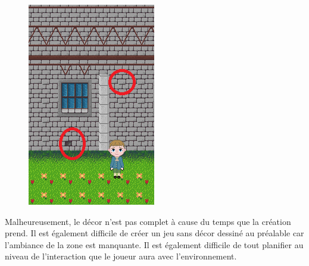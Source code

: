 \documentclass[11pt]{article}
\begin{document}
\begin{figure}[H]
\includegraphics{chateau}
\centering
\end{figure}

Malheureusement, le décor n'est pas complet à cause du temps que la création prend. Il est également difficile de créer un jeu sans décor dessiné au préalable car l'ambiance de la zone est manquante. Il est également difficile de tout planifier au niveau de l'interaction que le joueur aura avec l'environnement. \\



\newpage
\end{document}
